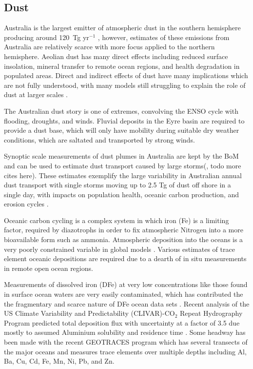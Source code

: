 \subsection{Dust}

Australia is the largest emitter of atmospheric dust in the southern hemisphere producing around 120~Tg yr$^{-1}$ \cite{Li_2008}, however, estimates of these emissions from Australia are relatively scarce with more focus applied to the northern hemisphere.
Aeolian dust has many direct effects including reduced surface insolation, mineral transfer to remote ocean regions, and health degradation in populated areas.
Direct and indirect effects of dust have many implications which are not fully understood, with many models still struggling to explain the role of dust at larger scales \cite{Rotstayn_2011}.

The Australian dust story is one of extremes, convolving the ENSO cycle with flooding, droughts, and winds.
Fluvial deposits in the Eyre basin are required to provide a dust base, which will only have mobility during suitable dry weather conditions, which are saltated and transported by strong winds\cite{Zender_2003}.

Synoptic scale measurements of dust plumes in Australia are kept by the BoM and can be used to estimate dust transport caused by large storms(\cite{Leys_2011}, todo more cites here). 
These estimates exemplify the large variability in Australian annual dust transport with single storms moving up to 2.5 Tg of dust off shore in a single day, with impacts on population health, oceanic carbon production, and erosion cycles \cite{Leys_2011,Shao_2007}.

Oceanic carbon cycling is a complex system in which iron (Fe) is a limiting factor, required by diazotrophs in order to fix atmospheric Nitrogen into a more bioavailable form such as ammonia.
Atmospheric deposition into the oceans is a very poorly constrained variable in global models \cite{Grand_2015}.
Various estimates of trace element oceanic depositions are required due to a dearth of in situ measurements in remote open ocean regions.

Measurements of dissolved iron (DFe) at very low concentrations like those found in surface ocean waters are very easily contaminated, which has contributed the the fragmentary and scarce nature of DFe ocean data sets \cite{Rijkenberg_2014}.
Recent analysis of the US Climate Variability and Predictability (CLIVAR)-CO$_{2}$ Repeat Hydrography Program predicted total deposition flux with uncertainty at a factor of 3.5 due mostly to assumed Aluminium solubility and residence time \cite{Grand_2015}.
Some headway has been made with the recent GEOTRACES program which has several transects of the major oceans and measures trace elements over multiple depths including Al, Ba, Cu, Cd, Fe, Mn, Ni, Pb, and Zn.
  
